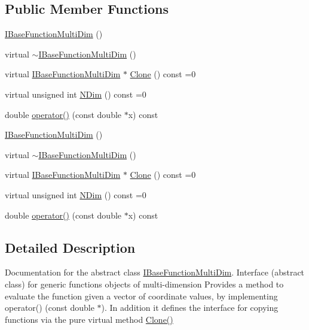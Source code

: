 \subsection*{Public Member Functions}
\begin{DoxyCompactItemize}
\item 
\mbox{\hyperlink{classROOT_1_1Math_1_1IBaseFunctionMultiDim_aef796a1f6a06fa1c4f183f001839aeac}{I\+Base\+Function\+Multi\+Dim}} ()
\item 
virtual \mbox{\hyperlink{classROOT_1_1Math_1_1IBaseFunctionMultiDim_a5133dc3b08b78281ddf471506810f1c4}{$\sim$\+I\+Base\+Function\+Multi\+Dim}} ()
\item 
virtual \mbox{\hyperlink{classROOT_1_1Math_1_1IBaseFunctionMultiDim}{I\+Base\+Function\+Multi\+Dim}} $\ast$ \mbox{\hyperlink{classROOT_1_1Math_1_1IBaseFunctionMultiDim_a57939204b1f525b43835b42e0635dd3b}{Clone}} () const =0
\item 
virtual unsigned int \mbox{\hyperlink{classROOT_1_1Math_1_1IBaseFunctionMultiDim_a16f37dc7a6d00c75ddeda0697741315d}{N\+Dim}} () const =0
\item 
double \mbox{\hyperlink{classROOT_1_1Math_1_1IBaseFunctionMultiDim_a7efd1892dc6473b3f8aaaff3cbb8bb2f}{operator()}} (const double $\ast$x) const
\item 
\mbox{\hyperlink{classROOT_1_1Math_1_1IBaseFunctionMultiDim_aef796a1f6a06fa1c4f183f001839aeac}{I\+Base\+Function\+Multi\+Dim}} ()
\item 
virtual \mbox{\hyperlink{classROOT_1_1Math_1_1IBaseFunctionMultiDim_a5133dc3b08b78281ddf471506810f1c4}{$\sim$\+I\+Base\+Function\+Multi\+Dim}} ()
\item 
virtual \mbox{\hyperlink{classROOT_1_1Math_1_1IBaseFunctionMultiDim}{I\+Base\+Function\+Multi\+Dim}} $\ast$ \mbox{\hyperlink{classROOT_1_1Math_1_1IBaseFunctionMultiDim_a57939204b1f525b43835b42e0635dd3b}{Clone}} () const =0
\item 
virtual unsigned int \mbox{\hyperlink{classROOT_1_1Math_1_1IBaseFunctionMultiDim_a16f37dc7a6d00c75ddeda0697741315d}{N\+Dim}} () const =0
\item 
double \mbox{\hyperlink{classROOT_1_1Math_1_1IBaseFunctionMultiDim_a7efd1892dc6473b3f8aaaff3cbb8bb2f}{operator()}} (const double $\ast$x) const
\end{DoxyCompactItemize}


\subsection{Detailed Description}
Documentation for the abstract class \mbox{\hyperlink{classROOT_1_1Math_1_1IBaseFunctionMultiDim}{I\+Base\+Function\+Multi\+Dim}}. Interface (abstract class) for generic functions objects of multi-\/dimension Provides a method to evaluate the function given a vector of coordinate values, by implementing operator() (const double $\ast$). In addition it defines the interface for copying functions via the pure virtual method \mbox{\hyperlink{classROOT_1_1Math_1_1IBaseFunctionMultiDim_a57939204b1f525b43835b42e0635dd3b}{Clone()}}

